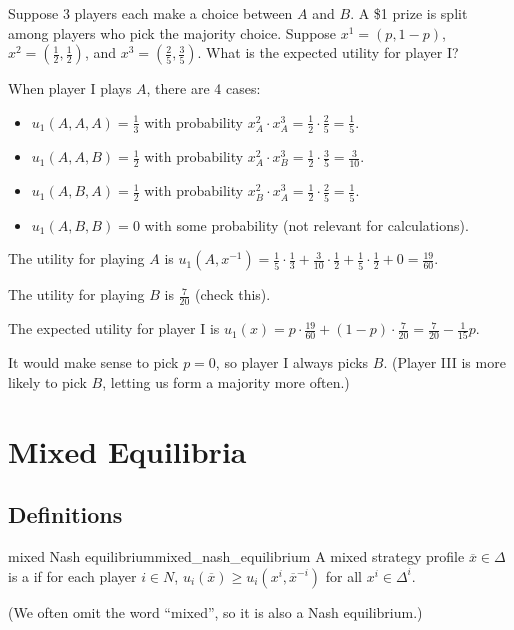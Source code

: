 \documentclass[12pt,letterpaper]{report}
\begin{document}
\begin{ex}
  Suppose 3 players each make a choice between $A$ and $B$.
  A \$1 prize is split among players who pick the majority choice.
  Suppose $x^1 = (p, 1 - p)$, $x^2 = (\frac{1}{2}, \frac{1}{2})$, and
  $x^3 = (\frac{2}{5}, \frac{3}{5})$.
  What is the expected utility for player I?

  When player I plays $A$, there are 4 cases:
  \begin{itemize}
    \item
    $u_1(A, A, A) = \frac{1}{3}$ with probability
    $x_A^2 \cdot x_A^3 = \frac{1}{2} \cdot \frac{2}{5} = \frac{1}{5}$.
    \item
    $u_1(A, A, B) = \frac{1}{2}$ with probability
    $x_A^2 \cdot x_B^3 = \frac{1}{2} \cdot \frac{3}{5} = \frac{3}{10}$.
    \item
    $u_1(A, B, A) = \frac{1}{2}$ with probability
    $x_B^2 \cdot x_A^3 = \frac{1}{2} \cdot \frac{2}{5} = \frac{1}{5}$.
    \item
    $u_1(A, B, B) = 0$ with some probability (not relevant for calculations).
  \end{itemize}
  The utility for playing $A$ is
  $u_1(A, x^{-1}) = \frac{1}{5} \cdot \frac{1}{3} + \frac{3}{10} \cdot \frac{1}{2} +
    \frac{1}{5} \cdot \frac{1}{2} + 0 = \frac{19}{60}$.

  The utility for playing $B$ is $\frac{7}{20}$ (check this).

  The expected utility for player I is $u_1(x) = p \cdot \frac{19}{60} + (1 - p) \cdot \frac{7}{20}
    = \frac{7}{20} - \frac{1}{15} p$.

  It would make sense to pick $p = 0$, so player I always picks $B$.
  (Player III is more likely to pick $B$, letting us form a majority more often.)
\end{ex}

\section{Mixed Equilibria}

\subsection{Definitions}

\begin{defn}{mixed Nash equilibrium}{mixed_nash_equilibrium}
  A mixed strategy profile $\overline{x} \in \Delta$ is a  if for each
  player $i \in N$, $u_i(\overline{x}) \geq u_i(x^i, \overline{x}^{-i})$ for all $x^i \in \Delta^i$.

  (We often omit the word ``mixed'', so it is also a Nash equilibrium.)
\end{defn}
\end{document}
